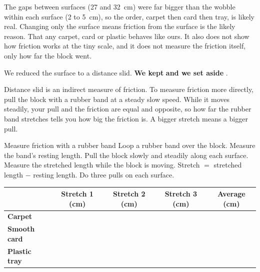 {The gaps between surfaces (27 and 32~cm) were far bigger than the wobble within each surface (2 to 5~cm), so the order, carpet then card then tray, is likely real. Changing only the surface means friction from the surface is the likely reason.}
{That any carpet, card or plastic behaves like ours. It also does not show how friction works at the tiny scale, and it does not measure the friction itself, only how far the block went.}

\begin{keepbox}
We reduced the surface to a distance slid. \textbf{We kept} \wline[3.4cm] \textbf{and we set aside} \wline[3.4cm].
\end{keepbox}

\clearpage

Distance slid is an indirect measure of friction. To measure friction more directly, pull the block with a rubber band at a steady slow speed. While it moves steadily, your pull and the friction are equal and opposite, so how far the rubber band stretches tells you how big the friction is. A bigger stretch means a bigger pull.

\begin{center}
\end{center}

\begin{tryit}{Measure friction with a rubber band}
Loop a rubber band over the block. Measure the band's resting length. Pull the block slowly and steadily along each surface. Measure the stretched length while the block is moving. Stretch $=$ stretched length $-$ resting length. Do three pulls on each surface.\par\medskip
\renewcommand{\arraystretch}{1.6}
\begin{tabular}{|l|c|c|c|c|}
\hline
 & \textbf{Stretch 1 (cm)} & \textbf{Stretch 2 (cm)} & \textbf{Stretch 3 (cm)} & \textbf{Average (cm)}\\ \hline
\textbf{Carpet} & & & & \\ \hline
\textbf{Smooth card} & & & & \\ \hline
\textbf{Plastic tray} & & & & \\ \hline
\end{tabular}
\end{tryit}

